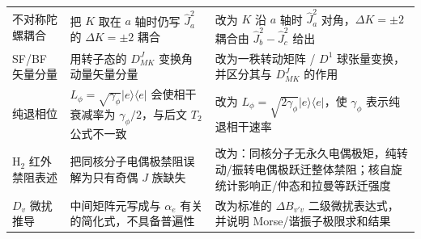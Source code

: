 \documentclass[
]{ctexbook}
\begin{document}
\begin{longtable}[]{@{}lll@{}}
\begin{minipage}[t]{0.30\columnwidth}
不对称陀螺耦合\strut
\end{minipage} & \begin{minipage}[t]{0.30\columnwidth}\raggedright
把 \(K\) 取在 \(a\) 轴时仍写 \(\hat J_a^2\) 的 \(\Delta K=\pm2\)
耦合\strut
\end{minipage} & \begin{minipage}[t]{0.30\columnwidth}\raggedright
改为 \(K\) 沿 \(a\) 轴时 \(\hat J_a^2\) 对角，\(\Delta K=\pm2\) 耦合由
\(\hat J_b^2-\hat J_c^2\) 给出\strut
\end{minipage}\tabularnewline
\begin{minipage}[t]{0.30\columnwidth}\raggedright
SF/BF 矢量分量\strut
\end{minipage} & \begin{minipage}[t]{0.30\columnwidth}\raggedright
用转子态的 \(D^J_{MK}\) 变换角动量矢量分量\strut
\end{minipage} & \begin{minipage}[t]{0.30\columnwidth}\raggedright
改为一秩转动矩阵 / \(D^1\) 球张量变换，并区分其与 \(D^J_{MK}\)
的作用\strut
\end{minipage}\tabularnewline
\begin{minipage}[t]{0.30\columnwidth}\raggedright
纯退相位\strut
\end{minipage} & \begin{minipage}[t]{0.30\columnwidth}\raggedright
\(L_\phi=\sqrt{\gamma_\phi}|e\rangle\langle e|\) 会使相干衰减率为
\(\gamma_\phi/2\)，与后文 \(T_2\) 公式不一致\strut
\end{minipage} & \begin{minipage}[t]{0.30\columnwidth}\raggedright
改为 \(L_\phi=\sqrt{2\gamma_\phi}|e\rangle\langle e|\)，使
\(\gamma_\phi\) 表示纯退相干速率\strut
\end{minipage}\tabularnewline
\begin{minipage}[t]{0.30\columnwidth}\raggedright
\(\mathrm{H}_2\) 红外禁阻表述\strut
\end{minipage} & \begin{minipage}[t]{0.30\columnwidth}\raggedright
把同核分子电偶极禁阻误解为只有奇偶 \(J\) 族缺失\strut
\end{minipage} & \begin{minipage}[t]{0.30\columnwidth}\raggedright
改为：同核分子无永久电偶极矩，纯转动/振转电偶极跃迁整体禁阻；核自旋统计影响正/仲态和拉曼等跃迁强度\strut
\end{minipage}\tabularnewline
\begin{minipage}[t]{0.30\columnwidth}\raggedright
\(D_v\) 微扰推导\strut
\end{minipage} & \begin{minipage}[t]{0.30\columnwidth}\raggedright
中间矩阵元写成与 \(\alpha_e\) 有关的简化式，不具备普遍性\strut
\end{minipage} & \begin{minipage}[t]{0.30\columnwidth}\raggedright
改为标准的 \(\Delta B_{v'v}\) 二级微扰表达式，并说明
Morse/谐振子极限求和结果\strut
\end{minipage}\tabularnewline
\bottomrule
\end{longtable}
\end{document}
